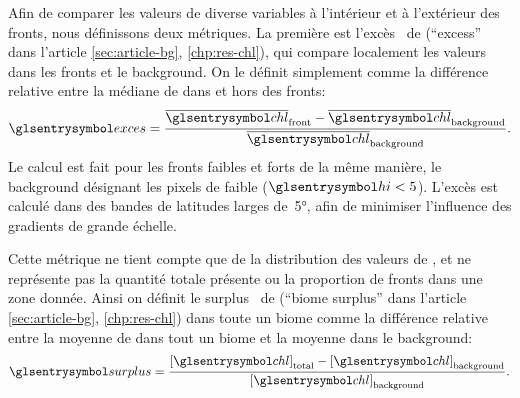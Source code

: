 Afin de comparer les valeurs de diverse variables à l'intérieur et à l'extérieur des fronts, nous définissons deux métriques.
La première est l'excès~ de  (\enquote{excess} dans l'article \cref{sec:article-bg}, \cref*{chp:res-chl}), qui compare localement les valeurs dans les fronts et le background. On le définit simplement comme la différence relative entre la médiane de  dans et hors des fronts:
\begin{equation}
  \am{exces} = \frac{\med{\am{chl}}_\frt - \med{\am{chl}}_\bkg}
  {\med{\am{chl}}_\bkg} .
\end{equation}
Le calcul est fait pour les fronts faibles et forts de la même manière, le background désignant les pixels de  faible (\(\am{hi} < 5\)).
L'excès est calculé dans des bandes de latitudes larges de~\ang{5}, afin de minimiser l'influence des gradients de grande échelle.

Cette métrique ne tient compte que de la distribution des valeurs de , et ne représente pas la quantité totale présente ou la proportion de fronts dans une zone donnée.
Ainsi on définit le surplus~ de  (\enquote{biome surplus} dans l'article \cref{sec:article-bg}, \cref*{chp:res-chl}) dans toute un biome comme la différence relative entre la moyenne de  dans tout un biome et la moyenne dans le background:
\begin{equation}
  \am{surplus} = \frac{\moy{\am{chl}}_\tot - \moy{\am{chl}}_\bkg}
  {\moy{\am{chl}}_\bkg} .
\end{equation}

